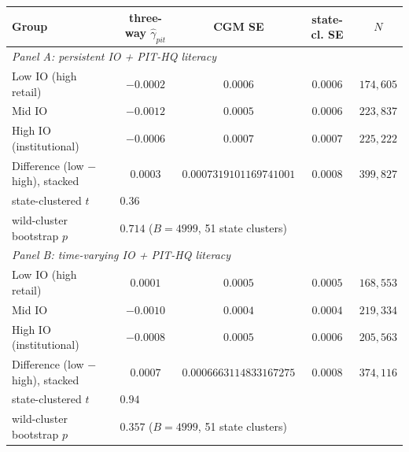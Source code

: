 \begin{tabular}{lcccc}
\hline\hline
Group & three-way $\hat\gamma_{pit}$ & CGM SE & state-cl. SE & $N$ \\
\hline
\multicolumn{5}{l}{\textit{Panel A: persistent IO + PIT-HQ literacy}} \\
Low IO (high retail) & $-0.0002$ & $0.0006$ & $0.0006$ & $174,605$ \\
Mid IO & $-0.0012$ & $0.0005$ & $0.0006$ & $223,837$ \\
High IO (institutional) & $-0.0006$ & $0.0007$ & $0.0007$ & $225,222$ \\
Difference (low $-$ high), stacked & $0.0003$ & $0.0007319101169741001$ & $0.0008$ & $399,827$ \\
\quad state-clustered $t$ & \multicolumn{4}{l}{$0.36$} \\
\quad wild-cluster bootstrap $p$ & \multicolumn{4}{l}{$0.714$ ($B=4999$, 51 state clusters)} \\
\hline
\multicolumn{5}{l}{\textit{Panel B: time-varying IO + PIT-HQ literacy}} \\
Low IO (high retail) & $0.0001$ & $0.0005$ & $0.0005$ & $168,553$ \\
Mid IO & $-0.0010$ & $0.0004$ & $0.0004$ & $219,334$ \\
High IO (institutional) & $-0.0008$ & $0.0005$ & $0.0006$ & $205,563$ \\
Difference (low $-$ high), stacked & $0.0007$ & $0.0006663114833167275$ & $0.0008$ & $374,116$ \\
\quad state-clustered $t$ & \multicolumn{4}{l}{$0.94$} \\
\quad wild-cluster bootstrap $p$ & \multicolumn{4}{l}{$0.357$ ($B=4999$, 51 state clusters)} \\
\hline\hline
\end{tabular}
